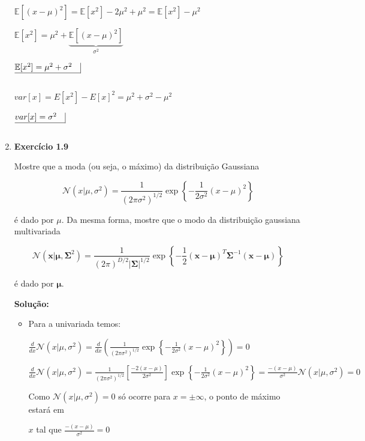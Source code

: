 \begin{enumerate}
    $\mathbb{E}[(x-\mu)^2] = \mathbb{E}[x^2]-2\mu^2 +\mu^2 = \mathbb{E}[x^2]-\mu^2$
    
    $\mathbb{E}[x^2] =\mu^2 + \underbrace{\mathbb{E}[(x-\mu)^2]}_{\sigma^2}$
    
    $\underline{ \mathbb{E}[x^2] =\mu^2 + \sigma^2 \quad} \vline$

    $ $

    $var[x]=E[x^2]-E[x]^2=\mu^2+\sigma^2-\mu^2$

    $\underline{var[x]=\sigma^2 \quad} \vline$
    
    $ $


\item \textbf{Exercício 1.9} \par

Mostre que a moda (ou seja, o máximo) da distribuição Gaussiana 

$$\mathcal{N}(x | \mu, \sigma^2)= \frac{1}{(2\pi\sigma^2)^{1/2}}\exp\left\{ -\frac{1}{2\sigma^2}(x - \mu)^2 \right\}$$

é dado por $\mu$. Da mesma forma, mostre que o modo da distribuição gaussiana multivariada 

$$\mathcal{N}(\boldsymbol{x} | \boldsymbol{\mu}, \boldsymbol{\Sigma}^2)= \frac{1}{(2\pi)^{D/2}|\boldsymbol{\Sigma}|^{1/2}}\exp\left\{ -\frac{1}{2}(\boldsymbol{x} - \boldsymbol{\mu})^T \boldsymbol{\Sigma}^{-1}(\boldsymbol{x} - \boldsymbol{\mu})  \right\}$$

é dado por $\boldsymbol{\mu}$.
\newline \par
\textbf{Solução:}

\begin{itemize}
    \item Para a univariada temos:
    

        $\frac{d}{dx} \mathcal{N}(x|\mu,\sigma^2) = \frac{d}{dx} \left( \frac{1}{(2\pi\sigma^2)^{1/2}}\exp\left\{ -\frac{1}{2\sigma^2}(x - \mu)^2 \right\} \right) = 0$
        
        $\frac{d}{dx} \mathcal{N}(x|\mu,\sigma^2) = \frac{1}{(2\pi\sigma^2)^{1/2}} \left[ \frac{-2(x-\mu)}{2\sigma^2} \right] \exp\left\{ -\frac{1}{2\sigma^2}(x - \mu)^2 \right\} = \frac{-(x-\mu)}{\sigma^2} \mathcal{N}(x|\mu,\sigma^2) = 0$
        
        Como $\mathcal{N}(x|\mu,\sigma^2) = 0$ só ocorre para $x = \pm \infty$, o ponto de máximo estará em
        
        $x$ tal que $\frac{-(x-\mu)}{\sigma^2} = 0$
        

\end{itemize}
\end{enumerate}
